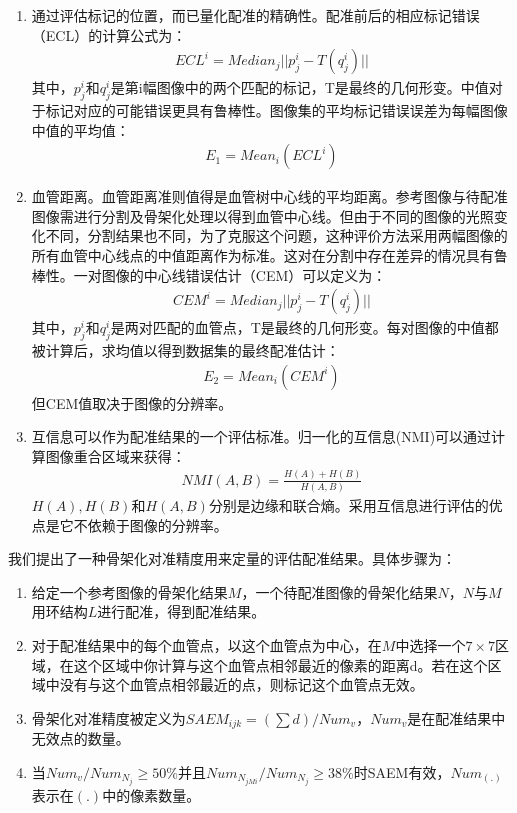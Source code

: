 \begin{enumerate}
\item 通过评估标记的位置，而已量化配准的精确性。配准前后的相应标记错误（ECL）的计算公式为：
\begin{align}
ECL^i = Median_{j}||p_j^i - T(q_j^i)|| 
\end{align}
其中，$p_j^i$和$q_j^i$是第i幅图像中的两个匹配的标记，T是最终的几何形变。中值对于标记对应的可能错误更具有鲁棒性。图像集的平均标记错误误差为每幅图像中值的平均值：
\begin{align}
E_1 = Mean_i(ECL^i)
\end{align}
\item 血管距离。血管距离准则值得是血管树中心线的平均距离。参考图像与待配准图像需进行分割及骨架化处理以得到血管中心线。但由于不同的图像的光照变化不同，分割结果也不同，为了克服这个问题，这种评价方法采用两幅图像的所有血管中心线点的中值距离作为标准。这对在分割中存在差异的情况具有鲁棒性。一对图像的中心线错误估计（CEM）可以定义为：
\begin{align}
CEM^i  = Median_j||p_j^i - T(q_j^i)||
\end{align}
其中，$p_j^i$和$q_j^i$是两对匹配的血管点，T是最终的几何形变。每对图像的中值都被计算后，求均值以得到数据集的最终配准估计：
\begin{align}
E_2 = Mean_i(CEM^i)
\end{align}
但CEM值取决于图像的分辨率。
\item 互信息可以作为配准结果的一个评估标准。归一化的互信息(NMI)可以通过计算图像重合区域来获得：
\begin{align}
NMI(A, B) = \frac{H(A)+H(B)}{H(A, B)}
\end{align}
$H(A), H(B)$和$H(A,B)$分别是边缘和联合熵。采用互信息进行评估的优点是它不依赖于图像的分辨率。
\end{enumerate}



我们提出了一种骨架化对准精度用来定量的评估配准结果。具体步骤为：
\begin{enumerate}
\item 给定一个参考图像的骨架化结果$M$，一个待配准图像的骨架化结果$N$，$N$与$M$用环结构$L$进行配准，得到配准结果。
\item 对于配准结果中的每个血管点，以这个血管点为中心，在$M$中选择一个$7 \times 7$区域，在这个区域中你计算与这个血管点相邻最近的像素的距离d。若在这个区域中没有与这个血管点相邻最近的点，则标记这个血管点无效。
\item 骨架化对准精度被定义为$SAEM_{ijk} = (\sum d) / Num_v$，$Num_v$是在配准结果中无效点的数量。
\item 当$Num_v / Num_{N_j} \geq 50 \%$并且$Num_{N_{jMi}} / Num_{N_j} \geq 38 \%$时SAEM有效，$Num_{(.)}$表示在$(.)$中的像素数量。
\end{enumerate}

